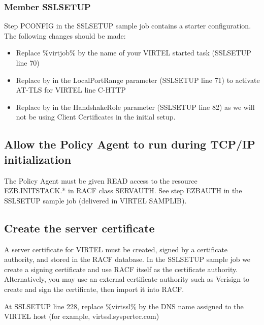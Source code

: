 \documentclass[letterpaper,10pt,english]{sphinxmanual}
\begin{document}
\subsubsection{Member SSLSETUP}
\label{\detokenize{connectivity_guide:member-sslsetup}}
Step PCONFIG in the SSLSETUP sample job contains a starter configuration. The following changes should be made:
\begin{itemize}
\item {} 
Replace \%virtjob\% by the name of your VIRTEL started task (SSLSETUP line 70)

\item {} 
Replace  by  in the LocalPortRange parameter (SSLSETUP line 71) to activate AT-TLS for VIRTEL line C-HTTP

\item {} 
Replace  by  in the HandshakeRole parameter (SSLSETUP line 82) as we will not be using Client Certificates in the initial setup.

\end{itemize}


\subsection{Allow the Policy Agent to run during TCP/IP initialization}
\label{\detokenize{connectivity_guide:allow-the-policy-agent-to-run-during-tcp-ip-initialization}}
The Policy Agent must be given READ access to the resource EZB.INITSTACK.* in RACF class SERVAUTH. See step EZBAUTH in the SSLSETUP sample job (delivered in VIRTEL SAMPLIB).


\subsection{Create the server certificate}
\label{\detokenize{connectivity_guide:create-the-server-certificate}}
A server certificate for VIRTEL must be created, signed by a certificate authority, and stored in the RACF database. In the SSLSETUP sample job we create a signing certificate and use RACF itself as the certificate authority. Alternatively, you may use an external certificate authority such as Verisign to create and sign the certificate, then import it into RACF.

At SSLSETUP line 228, replace \%virtssl\% by the DNS name assigned to the VIRTEL host (for example, virtssl.syspertec.com)
\end{document}
